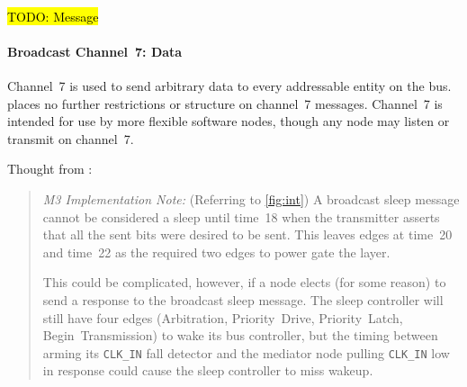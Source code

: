 ~

\hl{TODO: Message}


\paragraph{Broadcast Channel~7: Data}
\label{scratch:scratch:sec:channel-7}
Channel~7 is used to send arbitrary data to every addressable entity on the
bus. \bus places no further restrictions or structure on channel~7 messages.
Channel~7 is intended for use by more flexible software nodes, though any node
may listen or transmit on channel~7.


\begin{comment}
For a packaged system using \bus, simply providing an external {\tt DIN} and
{\tt DOUT} that is normally jumpered, plus access to the {\tt CLK} line, is
sufficient to allow transient bus elements (such as a programmer, debugger).

For completely contained systems, it is desirable to also define a bus
injection methodology that can be probed onto a chip, as well as a passive
listening method. \bus defines two additional, optional pads that may be added
to any node:

\begin{itemize}
  \item {\tt DSNOOP} -- Snoop, Data out
  \item {\tt MODE}   -- Connected?, Data in
\end{itemize}

The {\tt MODE} pad is connected to a weak pull-down resistor. During device
power-on, if the {\tt MODE} pad is found to be high, an external device is
assumed to be connected. In this case, the {\tt DIN} pad is routed to the {\tt
DSNOOP} pad and the {\tt MODE} pad is routed to the chip-internal {\tt DIN}
signal. Otherwise the {\tt MODE} pad is ignored and the chip {\tt DIN} pad
routes to both the chip-internal {\tt DIN} signal and the {\tt DSNOOP} pad.
These functions are determined during Power-On-Reset and remain fixed until a
future chip-Reset.
\end{comment}

Thought from :
\begin{quote}
\textit{M3 Implementation Note:} (Referring to
\cref{fig:int}) A broadcast sleep message cannot be considered a
sleep until time~18 when the transmitter asserts that all the sent bits were
desired to be sent. This leaves edges at time~20 and time~22 as the required
two edges to power gate the layer.

This could be complicated, however, if a node elects (for some reason) to send
a response to the broadcast sleep message. The sleep controller will still
have four edges (Arbitration, Priority~Drive, Priority~Latch,
Begin~Transmission) to wake its bus controller, but the timing between arming
its {\tt CLK\_IN} fall detector and the mediator node pulling {\tt CLK\_IN} low
in response could cause the sleep controller to miss wakeup.
\end{quote}
